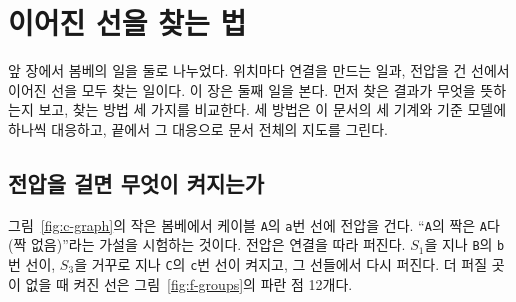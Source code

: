 \chapter{이어진 선을 찾는 법}\label{ch:find}

앞 장에서 봄베의 일을 둘로 나누었다. 위치마다 연결을 만드는 일과, 전압을 건 선에서 이어진 선을 모두 찾는
일이다. 이 장은 둘째 일을 본다. 먼저 찾은 결과가 무엇을 뜻하는지 보고, 찾는 방법 세 가지를 비교한다. 세 방법은
이 문서의 세 기계와 기준 모델에 하나씩 대응하고, 끝에서 그 대응으로 문서 전체의 지도를 그린다.

\section{전압을 걸면 무엇이 켜지는가}\label{sec:f-light}

그림~\ref{fig:c-graph}의 작은 봄베에서 케이블 \texttt{A}의 \texttt{a}번 선에 전압을 건다. ``\texttt{A}의 짝은
\texttt{A}다(짝 없음)''라는 가설을 시험하는 것이다. 전압은 연결을 따라 퍼진다. $S_1$을 지나 \texttt{B}의
\texttt{b}번 선이, $S_3$을 거꾸로 지나 \texttt{C}의 \texttt{c}번 선이 켜지고, 그 선들에서 다시 퍼진다. 더 퍼질
곳이 없을 때 켜진 선은 그림~\ref{fig:f-groups}의 파란 점 12개다.

